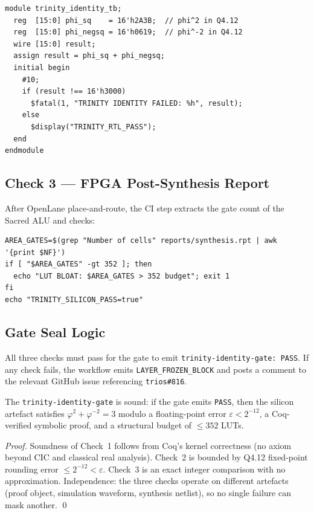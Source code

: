 \begin{verbatim}
module trinity_identity_tb;
  reg  [15:0] phi_sq    = 16'h2A3B;  // phi^2 in Q4.12
  reg  [15:0] phi_negsq = 16'h0619;  // phi^-2 in Q4.12
  wire [15:0] result;
  assign result = phi_sq + phi_negsq;
  initial begin
    #10;
    if (result !== 16'h3000)
      $fatal(1, "TRINITY IDENTITY FAILED: %h", result);
    else
      $display("TRINITY_RTL_PASS");
  end
endmodule
\end{verbatim}

\subsection{Check 3 — FPGA Post-Synthesis Report}

After OpenLane place-and-route, the CI step extracts the gate count of the
Sacred ALU and checks:
\begin{verbatim}
AREA_GATES=$(grep "Number of cells" reports/synthesis.rpt | awk '{print $NF}')
if [ "$AREA_GATES" -gt 352 ]; then
  echo "LUT BLOAT: $AREA_GATES > 352 budget"; exit 1
fi
echo "TRINITY_SILICON_PASS=true"
\end{verbatim}

\subsection{Gate Seal Logic}

All three checks must pass for the gate to emit
\texttt{trinity-identity-gate: PASS}.
If any check fails, the workflow emits \texttt{LAYER\_FROZEN\_BLOCK} and posts a
comment to the relevant GitHub issue referencing \texttt{trios\#816}.

\begin{theorem}\label{thm:gate-soundness}
The \texttt{trinity-identity-gate} is sound: if the gate emits \texttt{PASS},
then the silicon artefact satisfies \(\varphi^2 + \varphi^{-2} = 3\) modulo a
floating-point error \(\varepsilon < 2^{-12}\), a Coq-verified symbolic proof,
and a structural budget of \(\le 352\) LUTs.
\end{theorem}

\begin{proof}
Soundness of Check~1 follows from Coq's kernel correctness (no axiom beyond
CIC and classical real analysis).
Check~2 is bounded by Q4.12 fixed-point rounding error \(\le 2^{-12} < \varepsilon\).
Check~3 is an exact integer comparison with no approximation.
Independence: the three checks operate on different artefacts (proof object,
simulation waveform, synthesis netlist), so no single failure can mask another.
\qed
\end{proof}

